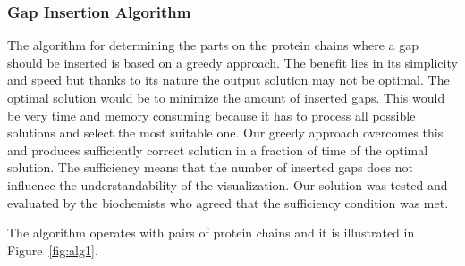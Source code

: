 \documentclass[twocolumn]{bmcart}%
\begin{document}

\subsubsection*{Gap Insertion Algorithm}
\label{sec:alg}
The algorithm for determining the parts on the protein chains where a gap should be inserted is based on a greedy approach.
The benefit lies in its simplicity and speed but thanks to its nature the output solution may not be optimal. 
The optimal solution would be to minimize the amount of inserted gaps.
This would be very time and memory consuming because it has to process all possible solutions and select the most suitable one.
Our greedy approach overcomes this and produces sufficiently correct solution in a fraction of time of the optimal solution.
The sufficiency means that the number of inserted gaps does not influence the understandability of the visualization.
Our solution was tested and evaluated by the biochemists who agreed that the sufficiency condition was met. 

The algorithm operates with pairs of protein chains and it is illustrated in Figure~\ref{fig:alg1}.
\end{document}

